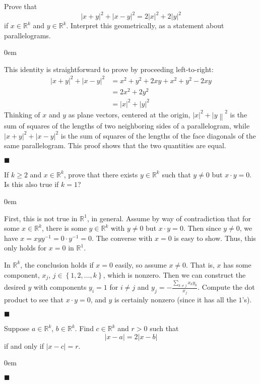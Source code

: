 \documentclass[12pt]{article}
\renewcommand{\qed}{\hfill$\blacksquare$}
\renewenvironment{proof}{\begin{addmargin}[1em]{0em}\begin{newproof}}{\end{newproof}\end{addmargin}\qed}
\newenvironment{problem}[2][Exercise]{\begin{trivlist}
\item[\hskip \labelsep {\bfseries #1}\hskip \labelsep {\bfseries #2.}]}{\end{trivlist}}
\begin{document}
\begin{problem}{1.17}
Prove that $$ \left|x+y\right|^2 + \left|x-y\right|^2 = 2\left|x\right|^2 + 2\left|y\right|^2 $$ if $x\in \mathbb{R}^k$ and $y\in \mathbb{R}^k$. Interpret this geometrically, as a statement about parallelograms.
\end{problem}
\begin{proof}
This identity is straightforward to prove by proceeding left-to-right: \begin{align*}
\left|x+y\right|^2 + \left|x-y\right|^2 & = x^2 + y^2 +2xy + x^2 + y^2 -2xy \\ & = 2x^2 + 2y^2 \\ & = \left|x\right|^2 + \left|y\right|^2 
\end{align*}
Thinking of $x$ and $y$ as plane vectors, centered at the origin, $\left|x\right|^2+\left|y\right\|^2$ is the sum of squares of the lengths of two neighboring sides of a parallelogram, while $\left|x+y\right|^2 + \left|x-y\right|^2$ is the sum of squares of the lengths of the face diagonals of the same parallelogram. This proof shows that the two quantities are equal.
\end{proof}

\begin{problem}{1.18}
If $k\geq 2$ and $x\in \mathbb{R}^k$, prove that there exists $y\in \mathbb{R}^k$ such that $y\neq 0$ but $x\cdot y = 0$. Is this also true if $k=1$?
\end{problem}
\begin{proof}
First, this is not true in $\mathbb{R}^1$, in general. Assume by way of contradiction that for some $x\in \mathbb{R}^k$, there is some $y\in \mathbb{R}^k$ with $y \neq 0$ but $x\cdot y = 0$. Then since $y\neq 0$, we have $x=xy y^{-1}=0\cdot y^{-1} = 0$. The converse with $x=0$ is easy to show. Thus, this only holds for $x=0$ in $\mathbb{R}^1$.

In $\mathbb{R}^k$, the conclusion holds if $x=0$ easily, so assume $x\neq 0$. That is, $x$ has some component, $x_j$, $j\in \left\{1,2,\ldots,k\right\}$, which is nonzero. Then we can construct the desired $y$ with components $y_i = 1$ for $i\neq j$ and $y_j = -\frac{\sum_{k\neq j} x_ky_k}{x_j}$. Compute the dot product to see that $x\cdot y =0 $, and $y$ is certainly nonzero (since it has all the $1$'s).
\end{proof}





\begin{problem}{1.19}
Suppose $a\in \mathbb{R}^k$, $b\in \mathbb{R}^k$. Find $c\in \mathbb{R}^k$ and $r>0$ such that $$ \left|x-a\right| = 2\left|x-b\right| $$ if and only if $\left|x-c\right| = r$.
\end{problem}
\begin{proof}

\end{proof}
\end{document}
